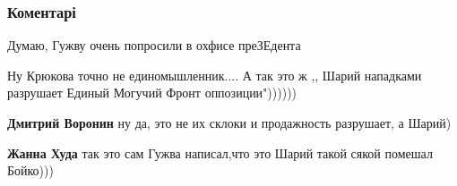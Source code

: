  
 
 
 
 
\subsubsection{Коментарі}

\begin{itemize}
 
Думаю, Гужву очень попросили в охфисе преЗЕдента

 
Ну Крюкова точно не единомышленник....
А так это ж ,, Шарий нападками разрушает Единый Могучий Фронт оппозиции"))))))

\begin{itemize}
 
\textbf{Дмитрий Воронин} ну да, это не их склоки и продажность разрушает, а Шарий)

 
\textbf{Жанна Худа} так это сам Гужва написал,что это Шарий такой сякой помешал Бойко)))

 

\end{itemize}
\end{itemize}
